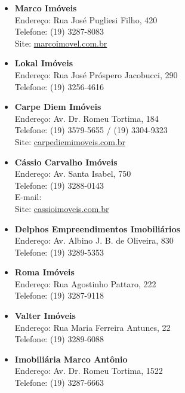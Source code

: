 \begin{itemize}
\item   \textbf{Marco Imóveis}
		\\Endereço: Rua José Pugliesi Filho, 420
		\\Telefone: (19) 3287-8083
		\\Site: \url{marcoimovel.com.br}

\item   \textbf{Lokal Imóveis}
		\\Endereço: Rua José Próspero Jacobucci, 290
		\\Telefone: (19) 3256-4616

\item   \textbf{Carpe Diem Imóveis}
		\\Endereço: Av. Dr. Romeu Tortima, 184
		\\Telefone: (19) 3579-5655 / (19) 3304-9323
		\\Site: \url{carpediemimoveis.com.br}

\item   \textbf{Cássio Carvalho Imóveis}
		\\Endereço: Av. Santa Isabel, 750
		\\Telefone: (19) 3288-0143
		\\E-mail: 
		\\Site: \url{cassioimoveis.com.br}

\item   \textbf{Delphos Empreendimentos Imobiliários}
        \\Endereço: Av. Albino J. B. de Oliveira, 830
        \\Telefone: (19) 3289-5353

\item   \textbf{Roma Imóveis}
        \\Endereço: Rua Agostinho Pattaro, 222
        \\Telefone: (19) 3287-9118

\item   \textbf{Valter Imóveis}
        \\Endereço: Rua Maria Ferreira Antunes, 22
        \\Telefone: (19) 3289-6088

\item   \textbf{Imobiliária Marco Antônio}
        \\Endereço: Av. Dr. Romeu Tortima, 1522
        \\Telefone: (19) 3287-6663
\end{itemize}
